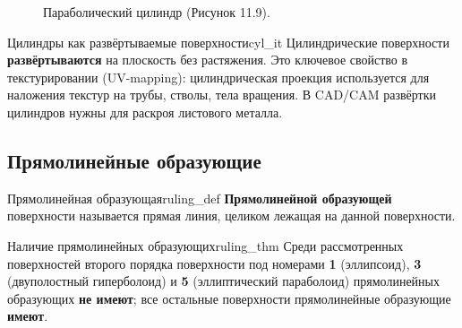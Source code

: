 \documentclass[12pt,a4paper]{article}
\begin{document}
\begin{figure}[h!]
  \centering
  \caption{Параболический цилиндр (Рисунок 11.9).}
  \label{fig:par_cyl}
\end{figure}

\begin{remarkIT}{Цилиндры как развёртываемые поверхности}{cyl_it}
  Цилиндрические поверхности \textbf{развёртываются} на плоскость без
  растяжения. Это ключевое свойство в текстурировании (UV-mapping):
  цилиндрическая проекция используется для наложения текстур на
  трубы, стволы, тела вращения. В CAD/CAM развёртки цилиндров нужны
  для раскроя листового металла.
\end{remarkIT}

\subsection*{Прямолинейные образующие}

\begin{definition}{Прямолинейная образующая}{ruling_def}
  \textbf{Прямолинейной образующей} поверхности называется прямая
  линия, целиком лежащая на данной поверхности.
\end{definition}

\begin{theorem}{Наличие прямолинейных образующих}{ruling_thm}
  Среди рассмотренных поверхностей второго порядка поверхности под
  номерами \textbf{1} (эллипсоид), \textbf{3} (двуполостный
  гиперболоид) и \textbf{5} (эллиптический параболоид) прямолинейных
  образующих \textbf{не имеют}; все остальные поверхности
  прямолинейные образующие \textbf{имеют}.
\end{theorem}
\end{document}

